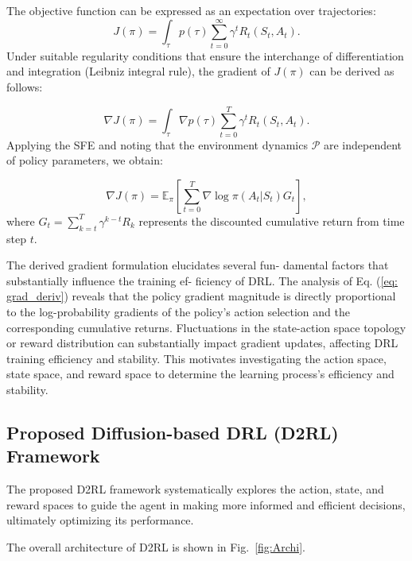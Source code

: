 \documentclass[comsoc,journal]{IEEEtran}
\begin{document}
The objective function can be expressed as an expectation over trajectories:
\begin{equation} 
	J(\pi) = \int_\tau p(\tau) \sum_{t=0}^\infty \gamma^t R_t(S_t, A_t). 
\end{equation}
Under suitable regularity conditions that ensure the interchange of differentiation and integration (Leibniz integral rule), the gradient of $J(\pi)$ can be derived as follows:

\begin{equation} 
	\nabla J(\pi) = \int_\tau \nabla p(\tau) \sum_{t=0}^T \gamma^t R_t(S_t, A_t).
\end{equation}
Applying the SFE and noting that the environment dynamics $\mathcal{P}$ are independent of policy parameters, we obtain:

\begin{equation} \label{eq: grad_deriv}
\nabla J(\pi) = \mathbb{E}_{\pi} \left[ \sum_{t=0}^T \nabla \log \pi(A_t | S_t) G_t \right],
\end{equation}
where $G_t = \sum_{k=t}^T \gamma^{k-t} R_k$ represents the discounted cumulative return from time step $t$.

The derived gradient formulation elucidates several fun-
damental factors that substantially influence the training ef-
ficiency of DRL. The analysis of Eq. (\ref{eq: grad_deriv}) reveals that the policy gradient magnitude is directly proportional to the log-probability gradients of the policy's action selection and the corresponding cumulative returns. Fluctuations in the state-action space topology or reward distribution can substantially impact gradient updates, affecting DRL training efficiency and stability. This motivates investigating the action space, state space, and reward space to determine the learning process's efficiency and stability.
\vspace{-8pt}
\subsection{Proposed Diffusion-based DRL (D2RL) Framework}
The proposed D2RL framework systematically explores the action, state, and reward spaces to guide the agent in making more informed and efficient decisions, ultimately optimizing its performance.

The overall architecture of D2RL is shown in Fig.~\ref{fig:Archi}.
\end{document}
